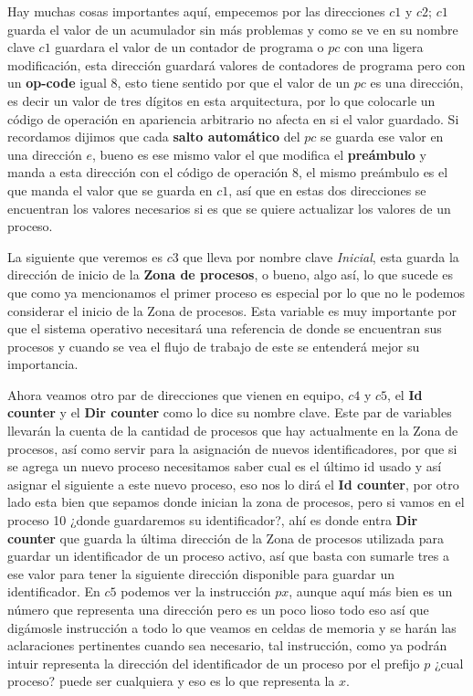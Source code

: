 \documentclass[12pt]{article}
\begin{document}
	Hay muchas cosas importantes aquí, empecemos por las direcciones $c1$ y $c2$; $c1$ guarda el valor
	de un acumulador sin más problemas y como se ve en su nombre clave $c1$
	guardara el valor de un  contador de programa o $pc$ con una ligera modificación,
	esta dirección guardará valores de contadores de programa pero
	con un \textbf{op-code} igual $8$, esto tiene sentido por que el valor de un $pc$ es una dirección, es decir un valor de tres
	dígitos en esta arquitectura, por lo que colocarle un código de operación en apariencia arbitrario no afecta en si
	el valor guardado. Si recordamos dijimos que cada \textbf{salto automático} del $pc$ se guarda ese valor en una dirección
	$e$, bueno es ese mismo valor el que modifica el \textbf{preámbulo} y manda a esta dirección con el código de operación $8$,
	el mismo preámbulo es el que manda el valor que se guarda en $c1$, así que en estas dos direcciones se encuentran los valores
	necesarios si es que se quiere actualizar los valores de un proceso.
	
	La siguiente que veremos es $c3$ que lleva por nombre clave \textit{Inicial}, esta guarda la dirección de inicio
	de la \textbf{Zona de procesos}, o bueno, algo así, lo que sucede es que como ya mencionamos el primer proceso es especial
	por lo que no le podemos considerar el inicio de la Zona de procesos. Esta variable es muy importante por que el
	sistema operativo necesitará una referencia de donde se encuentran sus procesos y cuando se vea el flujo de trabajo de este
	se entenderá mejor su importancia.
	
	Ahora veamos otro par de direcciones que vienen en equipo, $c4$ y $c5$, el \textbf{Id counter} y el \textbf{Dir counter} como
	lo dice su nombre clave. Este par de variables llevarán la cuenta de la cantidad de procesos que hay actualmente
	en la Zona de procesos, así como servir para la asignación de nuevos identificadores, por que si se agrega un nuevo proceso
	necesitamos saber cual es el último id usado y así asignar el siguiente a este nuevo proceso, eso nos lo dirá el
	\textbf{Id counter}, por otro lado esta bien que sepamos donde inician la zona de procesos, pero si vamos en
	el proceso 10 ¿donde guardaremos su identificador?, ahí es donde entra \textbf{Dir counter} que guarda la última dirección
	de la Zona de procesos utilizada para guardar un identificador de un proceso activo, así que basta con sumarle tres a ese
	valor para tener la siguiente dirección disponible para guardar un identificador. En $c5$ podemos ver la instrucción $px$, aunque
	aquí más bien es un número que representa una dirección pero es un poco lioso todo eso así que digámosle instrucción a todo
	lo que veamos en celdas de memoria y se harán las aclaraciones pertinentes cuando sea necesario, tal instrucción, como
	ya podrán intuir representa la dirección del identificador de un proceso por el prefijo $p$ ¿cual proceso? puede ser cualquiera
	y eso es lo que representa la $x$.
	
\end{document}
